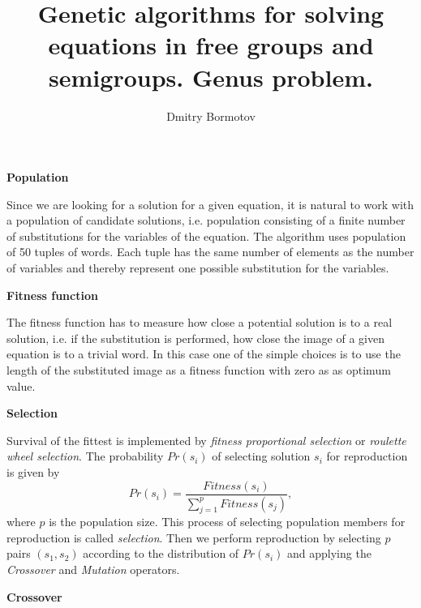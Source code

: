 \documentclass[12pt]{slides}
\title{Genetic algorithms for solving
equations in free groups and semigroups.  Genus problem.}
\author{Dmitry Bormotov} \date{}
\begin{document}
\pagestyle{empty}

\begin{center} \Large\textbf{Population} \end{center}
\vspace{5mm}

Since we are looking for a solution for a given equation, it is
natural to work with a population of candidate solutions,
i.e. population consisting of a finite number of substitutions for the
variables of the equation. The algorithm uses population of 50 tuples
of words. Each tuple has the same number of elements as the number of
variables and thereby represent one possible substitution for the
variables.

\vspace{5mm}
\begin{center} \Large\textbf{Fitness function} \end{center}
\vspace{5mm}

The fitness function has to measure how close a potential solution is
to a real solution, i.e. if the substitution is performed, how close
the image of a given equation is to a trivial word. In this case one
of the simple choices is to use the length of the substituted image as
a fitness function with zero as as optimum value. 


\newpage

\begin{center} \Large\textbf{Selection} \end{center}
\vspace{5mm}

Survival of the fittest is implemented by {\em fitness proportional
selection} or {\em roulette wheel selection}.  The probability
$Pr(s_i)$ of selecting solution $s_i$ for reproduction is given by
\[
	Pr(s_i) = \frac{Fitness(s_i)}{\sum_{j=1}^p Fitness(s_j)},
\]
where $p$ is the population size. This process of selecting population
members for reproduction is called {\em selection}. Then we perform
reproduction by selecting $p$ pairs $(s_1,s_2)$ according to the
distribution of $Pr(s_i)$ and applying the {\em Crossover} and
{\em Mutation} operators. 

\newpage

\begin{center} \Large\textbf{Crossover} \end{center}
\vspace{5mm}
\end{document}
